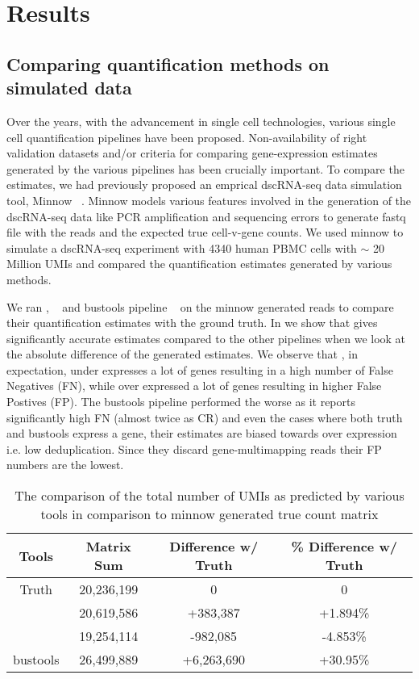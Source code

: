 \section{Results}
\subsection{Comparing quantification methods on simulated data}
\label{subsec:alv2_sims}
Over the years, with the advancement in single cell technologies, various single cell quantification 
pipelines have been proposed. Non-availability of right validation datasets and/or criteria for comparing 
gene-expression estimates generated by the various pipelines has been crucially important. To compare the estimates, we 
had previously proposed an emprical dscRNA-seq data simulation tool, Minnow ~\citep{sarkar2019minnow}. 
Minnow models various features involved in the generation of the dscRNA-seq data like PCR amplification and 
sequencing errors to generate fastq file with the reads and the expected true cell-v-gene counts. 
We used minnow to simulate a dscRNA-seq experiment with 4340 human PBMC cells with $\sim$ 
20 Million UMIs and compared the quantification estimates generated by various methods.

We ran \Alevin, \cellr ~\citep{tenx} and bustools pipeline ~\citep{melsted2019modular} on the minnow 
generated reads to compare their quantification estimates with the ground truth. 
In  we show that \alevin gives significantly accurate estimates 
compared to the other pipelines when we look at the absolute difference of the generated estimates. We observe 
that \cellr, in expectation, under expresses a lot of genes resulting in a high number of False Negatives (FN), 
while \alevin over expressed a lot of genes resulting in higher False Postives (FP). 
The bustools pipeline performed the worse as it reports significantly high FN (almost twice as CR) 
and even the cases where both truth and bustools express a gene, their estimates are biased towards 
over expression i.e. low deduplication. Since they discard gene-multimapping reads their FP 
numbers are the lowest.

\begin{table}[h!]
	\centering
	 \begin{tabular}{|| c | c c c||} 
		 \hline
		 Tools & Matrix Sum & Difference w/ Truth & \% Difference w/ Truth \\ [0.5ex] 
		 \hline\hline
		 Truth & 20,236,199  & 0 & 0 \\ 
		 \hline
		 \alevin & 20,619,586 & +383,387 & +1.894\% \\
		 \hline
		 \cellr & 19,254,114 & -982,085 & -4.853\% \\
		 \hline
		 bustools & 26,499,889 & +6,263,690 & +30.95\% \\ [1ex] 
		 \hline
 	\end{tabular}
	\caption{The comparison of the total number of UMIs as predicted by various tools 
	in comparison to minnow generated true count matrix }
	\label{tab:matrix_sum}
\end{table}

